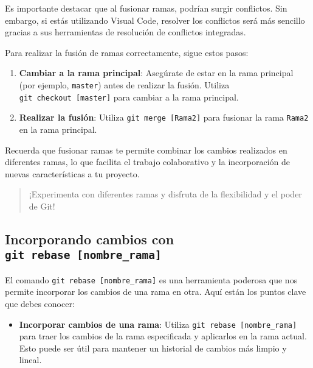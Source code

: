 \documentclass[
  letterpaper,
  DIV=11,
  numbers=noendperiod]{scrartcl}
\providecommand{\tightlist}{%
  \setlength{\itemsep}{0pt}\setlength{\parskip}{0pt}}\usepackage{longtable,booktabs,array}
\begin{document}
Es importante destacar que al fusionar ramas, podrían surgir conflictos.
Sin embargo, si estás utilizando Visual Code, resolver los conflictos
será más sencillo gracias a sus herramientas de resolución de conflictos
integradas.

Para realizar la fusión de ramas correctamente, sigue estos pasos:

\begin{enumerate}
\def\labelenumi{\arabic{enumi}.}
\item
  \textbf{Cambiar a la rama principal}: Asegúrate de estar en la rama
  principal (por ejemplo, \texttt{master}) antes de realizar la fusión.
  Utiliza \texttt{git\ checkout\ {[}master{]}} para cambiar a la rama
  principal.
\item
  \textbf{Realizar la fusión}: Utiliza \texttt{git\ merge\ {[}Rama2{]}}
  para fusionar la rama \texttt{Rama2} en la rama principal.
\end{enumerate}

Recuerda que fusionar ramas te permite combinar los cambios realizados
en diferentes ramas, lo que facilita el trabajo colaborativo y la
incorporación de nuevas características a tu proyecto.

\begin{quote}
¡Experimenta con diferentes ramas y disfruta de la flexibilidad y el
poder de Git!
\end{quote}

\hypertarget{incorporando-cambios-con-git-rebase-nombre_rama}{%
\subsection{\texorpdfstring{Incorporando cambios con
\texttt{git\ rebase\ {[}nombre\_rama{]}}}{Incorporando cambios con git rebase {[}nombre\_rama{]}}}\label{incorporando-cambios-con-git-rebase-nombre_rama}}

El comando \texttt{git\ rebase\ {[}nombre\_rama{]}} es una herramienta
poderosa que nos permite incorporar los cambios de una rama en otra.
Aquí están los puntos clave que debes conocer:

\begin{itemize}
\tightlist
\item
  \textbf{Incorporar cambios de una rama}: Utiliza
  \texttt{git\ rebase\ {[}nombre\_rama{]}} para traer los cambios de la
  rama especificada y aplicarlos en la rama actual. Esto puede ser útil
  para mantener un historial de cambios más limpio y lineal.
\end{itemize}
\end{document}
